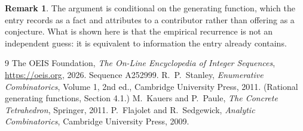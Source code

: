 \documentclass[11pt,a4paper]{article}
\theoremstyle{plain}
\theoremstyle{definition}
\newtheorem{remark}[theorem]{Remark}
\begin{document}
\begin{remark}
The argument is conditional on the generating function, which the entry records as a fact and
attributes to a contributor rather than offering as a conjecture. What is shown here is that
the empirical recurrence is not an independent guess: it is equivalent to information the
entry already contains.
\end{remark}

\begin{thebibliography}{9}
 The OEIS Foundation, \emph{The On-Line Encyclopedia of Integer
Sequences}, \url{https://oeis.org}, 2026. Sequence A252999.
 R.~P.~Stanley, \emph{Enumerative Combinatorics}, Volume 1, 2nd ed.,
Cambridge University Press, 2011. (Rational generating functions, Section 4.1.)
 M.~Kauers and P.~Paule, \emph{The Concrete Tetrahedron}, Springer, 2011.
 P.~Flajolet and R.~Sedgewick, \emph{Analytic Combinatorics}, Cambridge
University Press, 2009.
\end{thebibliography}
\end{document}
